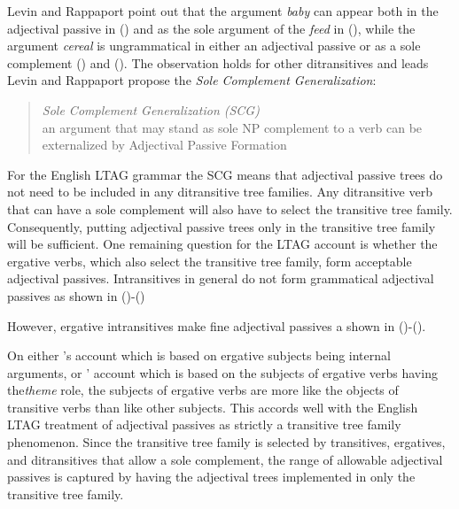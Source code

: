 
Levin and Rappaport point out that the argument {\it baby\/} can appear both in the adjectival passive in () and as the sole argument of the {\it feed\/} in (), while the argument {\it cereal\/} is ungrammatical in either an adjectival passive or as a sole complement () and ().  The observation holds for other ditransitives and leads  Levin and Rappaport propose the {\it Sole Complement Generalization}:

\begin{quote}
{\it Sole Complement Generalization (SCG)}\\
an argument that may stand as sole NP complement to a verb can be externalized by Adjectival Passive Formation
\end{quote}

For the English LTAG grammar the SCG means that adjectival passive trees do not need to be included in any ditransitive tree families.  Any ditransitive verb that can have a sole complement will also have to select the transitive tree family.  Consequently, putting adjectival passive trees only in the transitive tree family will be sufficient.  One remaining question for the LTAG account is whether the ergative verbs, which also select the transitive tree family, form acceptable adjectival passives.  Intransitives in general do not form grammatical adjectival passives as shown in ()-()


However,  ergative intransitives make fine adjectival passives a shown in ()-().



On either \cite{LevinRap}'s account which is based on ergative subjects being internal arguments, or \cite{Bresnan82}' account which is based on the subjects of ergative verbs having the{\it theme} role, the subjects of ergative verbs are more like the objects of transitive verbs than like other subjects.  This accords well with the English LTAG treatment of adjectival passives as strictly a transitive tree family phenomenon.  Since the transitive tree family is selected by transitives, ergatives, and ditransitives that allow a sole complement, the range of allowable adjectival passives is captured by having the adjectival trees implemented in only the transitive tree family.



